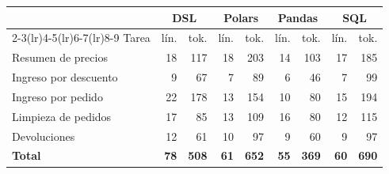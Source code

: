 \begin{tabular}{@{}lrrrrrrrr@{}}
\toprule
 & \multicolumn{2}{c}{DSL} & \multicolumn{2}{c}{Polars} & \multicolumn{2}{c}{Pandas} & \multicolumn{2}{c}{SQL} \\
\cmidrule(lr){2-3}\cmidrule(lr){4-5}\cmidrule(lr){6-7}\cmidrule(lr){8-9}
Tarea & lín. & tok. & lín. & tok. & lín. & tok. & lín. & tok. \\
\midrule
Resumen de precios & 18 & 117 & 18 & 203 & 14 & 103 & 17 & 185 \\
Ingreso por descuento & 9 & 67 & 7 & 89 & 6 & 46 & 7 & 99 \\
Ingreso por pedido & 22 & 178 & 13 & 154 & 10 & 80 & 15 & 194 \\
Limpieza de pedidos & 17 & 85 & 13 & 109 & 16 & 80 & 12 & 115 \\
Devoluciones & 12 & 61 & 10 & 97 & 9 & 60 & 9 & 97 \\
\midrule
\textbf{Total} & \textbf{78} & \textbf{508} & \textbf{61} & \textbf{652} & \textbf{55} & \textbf{369} & \textbf{60} & \textbf{690} \\
\bottomrule
\end{tabular}